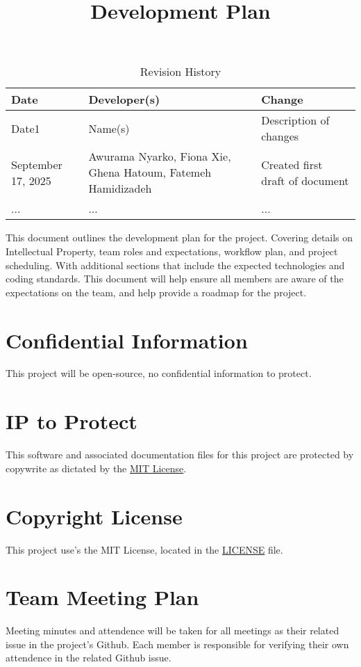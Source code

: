 \documentclass{article}
\title{Development Plan\\\progname}
\author{\authname}
\date{}
\begin{document}
\maketitle

\begin{table}[hp]
\caption{Revision History} \label{TblRevisionHistory}
\begin{tabularx}{\textwidth}{llX}
\toprule
\textbf{Date} & \textbf{Developer(s)} & \textbf{Change}\\
\midrule
Date1 & Name(s) & Description of changes\\
September 17, 2025 & Awurama Nyarko, Fiona Xie, Ghena Hatoum, Fatemeh Hamidizadeh & Created first draft of document\\
... & ... & ...\\
\bottomrule
\end{tabularx}
\end{table}

\newpage{}
This document outlines the development plan for the project. Covering details on Intellectual Property, team roles and expectations, workflow plan, and project scheduling.
With additional sections that include the expected technologies and coding standards. This document will help ensure all members are aware of the expectations on the team, and help provide a roadmap for the project.

\section{Confidential Information}
This project will be open-source, no confidential information to protect.

\section{IP to Protect}
This software and associated documentation files for this project are protected by copywrite as dictated by the \href{https://github.com/thaafei/capstone-sfw2026/blob/main/LICENSE}{MIT License}.

\section{Copyright License}
This project use's the MIT License, located in the \href{https://github.com/thaafei/capstone-sfw2026/blob/main/LICENSE}{LICENSE} file.

\section{Team Meeting Plan}
Meeting minutes and attendence will be taken for all meetings as their related issue in the project's Github. Each member is responsible for verifying their own attendence in the related Github issue.
\end{document}
